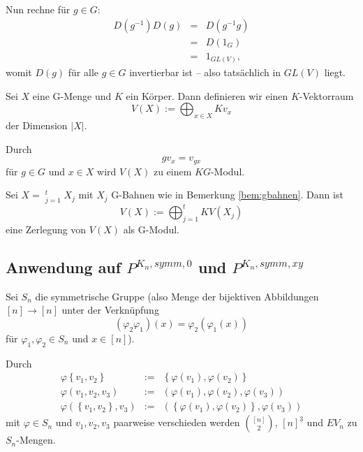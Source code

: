 \documentclass[10p,a4paper,BCOR = 12mm, DIV=15]{scrbook}
\begin{document}
\begin{Bem}
Nun rechne für $g \in G$:
\begin{eqnarray*}
D\left(g^{-1}\right) D\left(g\right) & = &  D\left(g^{-1} g\right) \\
& = & D\left(1_G\right) \\
& = & 1_{GL\left(V\right)},
\end{eqnarray*}
womit $D\left(g\right)$ für alle $g \in G$ invertierbar ist -- also tatsächlich in $GL\left(V\right)$ liegt.
\end{Bem}

\begin{Def}
\label{def:G-Menge-Modul}
Sei $X$ eine G-Menge und $K$ ein Körper. Dann definieren wir einen $K$-Vektorraum
\begin{displaymath}
V\left(X\right) := \bigoplus_{x \in X} K v_{x}
\end{displaymath}
der Dimension $\left|X\right|$.

Durch
\begin{displaymath}
g v_{x} = v_{g x}
\end{displaymath}
für $g\in G$ und $x \in X$ wird $V\left(X\right)$ zu einem $K G$-Modul.
\end{Def}

\begin{Bem}
Sei $X = \mathop{\dot{\bigcup}}_{j=1}^t X_j$ mit $X_j$ G-Bahnen wie in Bemerkung \ref{bem:gbahnen}. Dann ist
\begin{displaymath}
V\left(X\right) := \bigoplus_{j=1}^t K V\left(X_j\right)
\end{displaymath}
eine Zerlegung von $V\left(X\right)$ als G-Modul.
\end{Bem}

\subsection{Anwendung auf $P^{K_n, symm, 0}$ und $P^{K_n, symm, xy}$}

Sei $S_n$ die symmetrische Gruppe (also Menge der bijektiven Abbildungen $\left[n\right] \rightarrow \left[n\right]$ unter der Verknüpfung
\begin{displaymath}
\left(\varphi_2 \varphi_1\right) \left(x\right) = \varphi_2 \left(\varphi_1 \left(x\right)\right) 
\end{displaymath}
für $\varphi_1, \varphi_2 \in S_n$ und $x\in \left[n\right]$).

Durch
\begin{eqnarray*}
\varphi \left\{v_1, v_2\right\} & := & \left\{\varphi\left(v_1\right), \varphi\left(v_2\right)\right\} \\
\varphi \left(v_1, v_2, v_3\right) & := & \left(\varphi\left(v_1\right), \varphi\left(v_2\right), \varphi\left(v_3\right)\right) \\
\varphi \left(\left\{v_1, v_2\right\}, v_3\right) & := & \left(\left\{\varphi\left(v_1\right), \varphi\left(v_2\right)\right\}, \varphi\left(v_3\right)\right)
\end{eqnarray*}
mit $\varphi \in S_n$ und $v_1, v_2, v_3$ paarweise verschieden werden ${\left[n\right] \choose 2}$, $\left[n\right]^{\underline{3}}$ und $EV_n$ zu $S_n$-Mengen.
\end{document}
